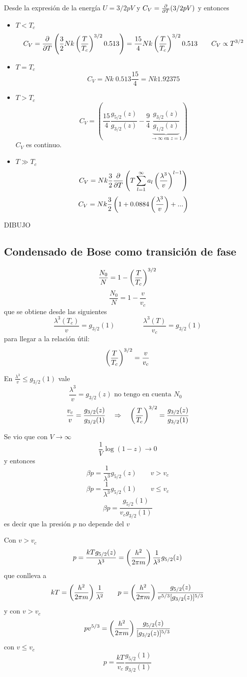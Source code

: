 \documentclass[10pt,oneside]{CBFT_book}
\begin{document}
Desde la expresión de la energía $ U = 3/2 p V $ y $C_V = \frac{\partial^{\hspace{-0.05em}} {}}{\partial {T}^{\hspace{-0.05em}}}(3/2 p V)$
y entonces
\begin{itemize}
 \item $ T < T_c $ 
 \[
	C_V = \frac{\partial^{\hspace{-0.05em}} {}}{\partial {T}^{\hspace{-0.05em}}}\left( \frac{3}{2} N k \left( \frac{ T }{ T_c } \right)^{3/2} 0.513  \right) = 
	\frac{15}{4} N k \left( \frac{ T }{ T_c } \right)^{3/2} 0.513 \qquad C_V \propto T^{3/2}
 \]
 \item $ T = T_c $ 
 \[
	C_V = N k \; 0.513 \frac{15}{4} = N k 1.92375
 \]
 \item $ T > T_c $ 
 \[
	C_V = \left( \frac{15}{4}\frac{ g_{5/2}(z) }{ g_{3/2}(z) } - 
	\frac{9}{4} \underbrace{\frac{ g_{3/2}(z) }{ g_{1/2}(z) }}_{\to \infty \text{ en } z=1} \right)
 \]
 $C_V$ es continuo.
 \item $ T \gg T_c $ 
 \[
	C_V = N k \frac{3}{2} \frac{\partial^{\hspace{-0.05em}} {}}{\partial {T}^{\hspace{-0.05em}}} \left( T \sum_{l=1}^\infty a_l \left( \frac{ \lambda^3 }{ v } \right)^{l-1} \right)
 \]
 \[
	C_V = N k \frac{3}{2} \left( 1 + 0.0884 \left( \frac{ \lambda^3 }{ v } \right) + ... \right)
 \]
\end{itemize}

DIBUJO

\subsection{Condensado de Bose como transición de fase}

\[
	\frac{N_0}{N} = 1 - \left( \frac{ T }{ T_c } \right)^{3/2}
\]
\[
	\frac{N_0}{N} = 1 - \frac{v}{v_c}
\]
que se obtiene desde las siguientes
\[
	\frac{\lambda^3(T_c)}{v} = g_{3/2}(1) \qquad \qquad  \frac{\lambda^3(T)}{v_c} = g_{3/2}(1)
\]
para llegar a la relación útil:
\[
	\left( \frac{ T }{ T_c } \right)^{3/2} = \frac{v}{v_c}
\]

En $ \frac{\lambda^3}{v} \leq g_{3/2}(1) $ vale 
\[
	\frac{\lambda^3}{v} = g_{3/2}(z) \text{ no tengo en cuenta $N_0$ }
\]
\[
	\frac{v_c}{v} = \frac{ g_{3/2}(z) }{ g_{3/2}(1) } \quad \Rightarrow \quad 
	\left( \frac{ T }{ T_c } \right)^{3/2} = \frac{ g_{3/2}(z) }{ g_{3/2}(1) } 
\]

Se vio que con $ V \to \infty $
\[
	\frac{1}{V} \log (1-z) \to 0 
\]
y entonces 
\[
	\beta p = \frac{1}{\lambda^3} g_{5/2}(z) \qquad v > v_c
\]
\[
	\beta p = \frac{1}{\lambda^3} g_{5/2}(1) \qquad v \leq v_c
\]
\[
	\beta p = \frac{ g_{5/2}(1) }{ v_c g_{3/2}(1) }
\]
es decir que la presión $p$ no depende del $v$

Con $v > v_c$ 
\[
	p = \frac{ k T g_{5/2}(z) }{\lambda^3} = \left( \frac{ h^2 }{  2\pi m  } \right) \frac{1}{\lambda^3} g_{5/2}(z)
\]
que conlleva a 
\[
	kT = \left( \frac{ h^2 }{  2\pi m  } \right) \frac{1}{\lambda^2} \qquad 
	p =  \left( \frac{ h^2 }{  2\pi m  } \right) \frac{ g_{5/2}(z) }{ v^{5/3} [ g_{3/2}(z) ]^{5/3} }
\]
y con $v > v_c$ 
\[
	pv^{5/3} = \left( \frac{ h^2 }{  2\pi m  } \right) \frac{ g_{5/2}(z) }{ [ g_{3/2}(z) ]^{5/3} }
\]
con $v \leq v_c$ 
\[
	p = \frac{ k T }{ v_c } \frac{ g_{5/2}(1) }{ g_{3/2}(1) }
\]
\end{document}
